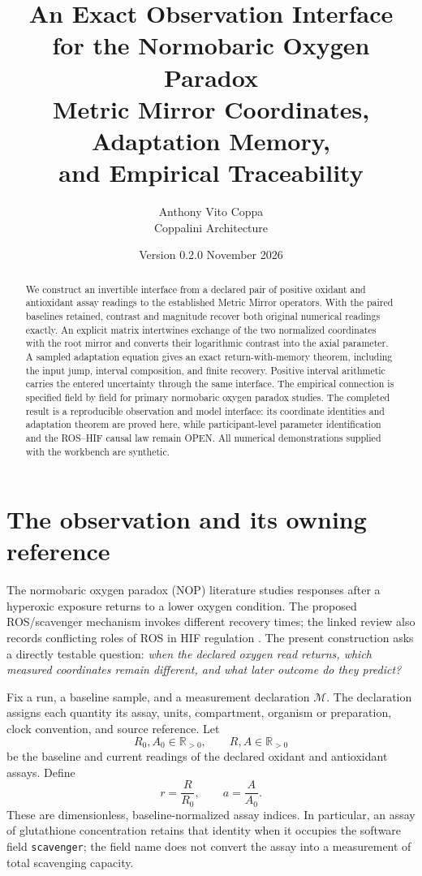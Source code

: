 \documentclass[11pt]{article}
\title{\Large\bfseries An Exact Observation Interface\\
for the Normobaric Oxygen Paradox\\[7pt]
\normalsize\mdseries Metric Mirror Coordinates, Adaptation Memory,\\
and Empirical Traceability}
\author{Anthony Vito Coppa\\\small Coppalini Architecture}
\date{Version 0.2.0 \quad 12 November 2026}
\newcommand{\pos}{\mathbb R_{>0}}
\newcommand{\code}[1]{\nolinkurl{#1}}
\newcommand{\OPEN}{\textup{OPEN}}
\begin{document}
\maketitle
\vspace{-1em}
\begin{abstract}
We construct an invertible interface from a declared pair of positive oxidant
and antioxidant assay readings to the established Metric Mirror operators.
With the paired baselines retained, contrast and magnitude recover both
original numerical readings exactly. An explicit matrix intertwines exchange
of the two normalized coordinates with the root mirror and converts their
logarithmic contrast into the axial parameter. A sampled adaptation equation
gives an exact return-with-memory theorem, including the input jump,
interval composition, and finite recovery. Positive interval arithmetic carries
the entered uncertainty through the same interface. The empirical connection
is specified field by field for primary normobaric oxygen paradox studies.
The completed result is a reproducible observation and model interface:
its coordinate identities and adaptation theorem are proved here, while
participant-level parameter identification and the ROS--HIF causal law remain
\OPEN. All numerical demonstrations supplied with the workbench are synthetic.
\end{abstract}

\section{The observation and its owning reference}

The normobaric oxygen paradox (NOP) literature studies responses after a
hyperoxic exposure returns to a lower oxygen condition. The proposed
ROS/scavenger mechanism invokes different recovery times; the linked review
also records conflicting roles of ROS in HIF regulation \cite{review}.
The present construction asks a directly testable question:
\emph{when the declared oxygen read returns, which measured coordinates
remain different, and what later outcome do they predict?}

Fix a run, a baseline sample, and a measurement declaration \(\mathcal M\).
The declaration assigns each quantity its assay, units, compartment,
organism or preparation, clock convention, and source reference. Let
\[
 R_0,A_0\in\pos,\qquad R,A\in\pos
\]
be the baseline and current readings of the declared oxidant and antioxidant
assays. Define
\begin{equation}\label{eq:normalized}
 r=\frac{R}{R_0},\qquad a=\frac{A}{A_0}.
\end{equation}
These are dimensionless, baseline-normalized assay indices. In particular,
an assay of glutathione concentration retains that identity when it occupies
the software field \code{scavenger}; the field name does not convert the assay
into a measurement of total scavenging capacity.
\end{document}
